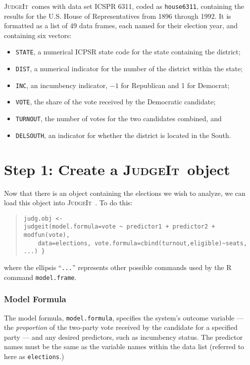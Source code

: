 \documentclass[oneside,letterpaper,titlepage]{article}
\newcommand{\JudgeIt}{\textsc{JudgeIt}\ }
\begin{document}
\JudgeIt comes with data set ICSPR 6311, coded as \texttt{house6311},
containing the results for the U.S. House of Representatives from
1896 through 1992. It is formatted as a list of 49 data frames, each
named for their election year, and containing six vectors:
\begin{itemize}
\item \texttt{STATE}, a numerical ICPSR state code for the state
  containing the district;

\item \texttt{DIST}, a numerical indicator for the number of the
  district within the state;

\item \texttt{INC}, an incumbency indicator, $-1$ for Republican and 1
  for Democrat;

\item \texttt{VOTE}, the share of the vote received by the Democratic
  candidate;

\item \texttt{TURNOUT}, the number of votes for the two candidates
  combined, and

\item \texttt{DELSOUTH}, an indicator for whether the district is
  located in the South.
\end{itemize}

\section{Step 1: Create a \JudgeIt object}

Now that there is an object containing the elections we wish to
analyze, we can load this object into \JudgeIt.  To do this:
\begin{quote}
\begin{verbatim}
judg.obj <-
judgeit(model.formula=vote ~ predictor1 + predictor2 + modfun(vote),
    data=elections, vote.formula=cbind(turnout,eligible)~seats, ...) }
\end{verbatim}
\end{quote}

\noindent where the ellipsis ``\texttt{...}'' represents other possible
commands used by the R command \texttt{model.frame}.

\subsubsection*{Model Formula}

The model formula, \texttt{model.formula}, specifies the system's outcome
variable --- the \emph{proportion} of the two-party vote received by
the candidate for a specified party --- and any desired predictors,
such as incumbency status.  The predictor names must be the same as
the variable names within the data list (referred to here as
\texttt{elections}.)
\end{document}
